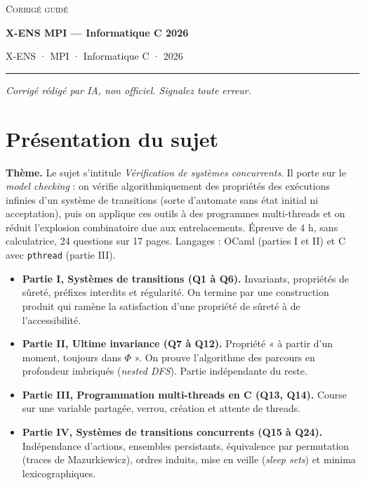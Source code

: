 \documentclass[11pt,a4paper]{article}
\providecommand{\tightlist}{\setlength{\itemsep}{0pt}\setlength{\parskip}{0pt}}
\begin{document}
\thispagestyle{plain}
\begin{center}
  {\small\scshape Corrigé guidé}\par\smallskip
  {\LARGE\bfseries X-ENS MPI — Informatique C 2026\par}\medskip
  {\large X-ENS · MPI · Informatique C · 2026\par}
\end{center}
\vspace{2pt}\hrule\vspace{8pt}

\emph{Corrigé rédigé par IA, non officiel. Signalez toute erreur.}

\hypertarget{pruxe9sentation-du-sujet}{%
\section{Présentation du sujet}\label{pruxe9sentation-du-sujet}}

\textbf{Thème.} Le sujet s'intitule \emph{Vérification de systèmes concurrents}. Il porte sur le \emph{model checking} : on vérifie algorithmiquement des propriétés des exécutions infinies d'un système de transitions (sorte d'automate sans état initial ni acceptation), puis on applique ces outils à des programmes multi-threads et on réduit l'explosion combinatoire due aux entrelacements. Épreuve de 4 h, sans calculatrice, 24 questions sur 17 pages. Langages : OCaml (parties I et II) et C avec \texttt{pthread} (partie III).

\begin{itemize}
\tightlist
\item
  \textbf{Partie I, Systèmes de transitions (Q1 à Q6).} Invariants, propriétés de sûreté, préfixes interdits et régularité. On termine par une construction produit qui ramène la satisfaction d'une propriété de sûreté à de l'accessibilité.
\item
  \textbf{Partie II, Ultime invariance (Q7 à Q12).} Propriété « à partir d'un moment, toujours dans \(\Phi\) ». On prouve l'algorithme des parcours en profondeur imbriqués (\emph{nested DFS}). Partie indépendante du reste.
\item
  \textbf{Partie III, Programmation multi-threads en C (Q13, Q14).} Course sur une variable partagée, verrou, création et attente de threads.
\item
  \textbf{Partie IV, Systèmes de transitions concurrents (Q15 à Q24).} Indépendance d'actions, ensembles persistants, équivalence par permutation (traces de Mazurkiewicz), ordres induits, mise en veille (\emph{sleep sets}) et minima lexicographiques.
\end{itemize}
\end{document}
